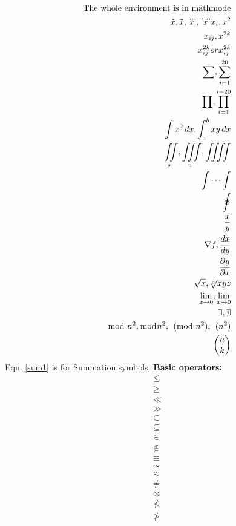     \begin{align}
        \text{The whole environment is in mathmode}\nonumber \\
        \dot{x}, \ddot{x}, \dddot{x}, \ddddot{x} x_i, x^2 \\
        x_{ij}, x^{2k}\\
        x^{2k}_{ij} or x_{ij}^{2k}\\
        \sum, \sum_{i=1}^{20} \label{sum1}\\
        \prod, \prod_{i=1}^{i=20}\\
        \int x^2\,dx,\int_a^b xy\,dx \\
        \iint\limits_s,\iiint\limits_v, \iiiint \\
        \idotsint \\
        \oint \\
        \frac{x}{y} \\
        \nabla{f}, \frac{dx}{dy} \\
        \frac{\partial{y}}{\partial{x}}\\
        \sqrt{x}, \sqrt[5]{xyz} \\
        \lim_{x\to 0}, \underset{x\to 0}{\lim}\\
        \exists,\nexists \\
        \mod{n^2},\bmod{n^2},\pmod{n^2},\pod{n^2} \\
        \binom{n}{k}
    \end{align}
    Eqn. \ref{sum1} is for Summation symbols.
    \newpage
    {\Large\bf Basic operators:}\\
   \begin{eqnarray*}
    \leq \\
    \geq \\ 
    \ll \\
    \gg \\
    \subset \\
    \subseteq \\
    \in \\
    \not\in \\
    \equiv \\
    \sim \\
    \approx \\
    \neq \\
    \propto \\
    \not< \\
    \not> 
   \end{eqnarray*}

